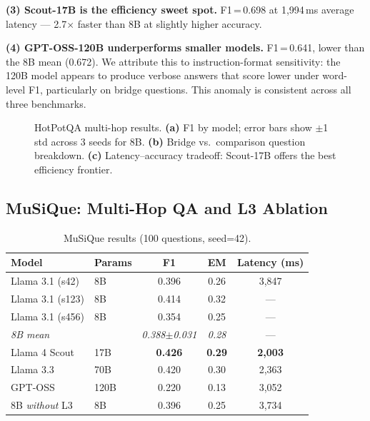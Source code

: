 \documentclass{article}
\begin{document}
\textbf{(3) Scout-17B is the efficiency sweet spot.}  F1\,=\,0.698 at 1,994\,ms
average latency — 2.7$\times$ faster than 8B at slightly higher accuracy.

\textbf{(4) GPT-OSS-120B underperforms smaller models.}
F1\,=\,0.641, lower than the 8B mean (0.672).  We attribute this to
instruction-format sensitivity: the 120B model appears to produce verbose
answers that score lower under word-level F1, particularly on bridge questions.
This anomaly is consistent across all three benchmarks.

\begin{figure}[h]
\centering
{}
\caption{HotPotQA multi-hop results.  \textbf{(a)} F1 by model; error bars show $\pm$1 std
  across 3 seeds for 8B.  \textbf{(b)} Bridge vs.\ comparison question breakdown.
  \textbf{(c)} Latency–accuracy tradeoff: Scout-17B offers the best efficiency frontier.}
\label{fig:hotpotqa}
\end{figure}

\subsection{MuSiQue: Multi-Hop QA and L3 Ablation}
\label{sec:musique}

\begin{table}[h]
\centering
\caption{MuSiQue results (100 questions, seed=42).}
\label{tab:musique}
\begin{tabular}{llccc}
\toprule
Model & Params & F1 & EM & Latency (ms) \\
\midrule
Llama 3.1 (s42)    & 8B   & 0.396 & 0.26 & 3,847 \\
Llama 3.1 (s123)   & 8B   & 0.414 & 0.32 & --- \\
Llama 3.1 (s456)   & 8B   & 0.354 & 0.25 & --- \\
\textit{8B mean}   &      & \textit{0.388$\pm$0.031} & \textit{0.28} & --- \\
\midrule
Llama 4 Scout      & 17B  & \textbf{0.426} & \textbf{0.29} & \textbf{2,003} \\
Llama 3.3          & 70B  & 0.420 & 0.30 & 2,363 \\
GPT-OSS            & 120B & 0.220 & 0.13 & 3,052 \\
\midrule
8B \textit{without} L3 & 8B & 0.396 & 0.25 & 3,734 \\
\bottomrule
\end{tabular}
\end{table}
\end{document}
